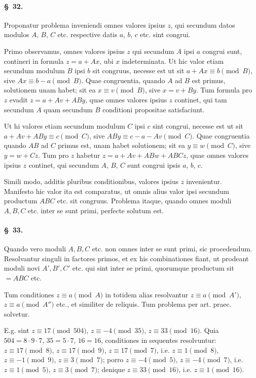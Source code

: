 \documentclass[12pt,a4paper]{article}
\theoremstyle{plain}
\theoremstyle{definition}
\theoremstyle{remark}
\newcommand{\art}[1]{\paragraph{\S\ #1.}}
\begin{document}
\art{32}
Proponatur problema inveniendi omnes valores ipsius $z$, qui secundum datos modulos $A$, $B$, $C$ etc. respective datis $a$, $b$, $c$ etc. sint congrui.

Primo observamus, omnes valores ipsius $z$ qui secundum $A$ ipsi $a$ congrui sunt, contineri in formula $z = a + Ax$, ubi $x$ indeterminata. Ut hic valor etiam secundum modulum $B$ ipsi $b$ sit congruus, necesse est ut sit $a + Ax \equiv b \pmod{B}$, sive $Ax \equiv b - a \pmod{B}$. Quae congruentia, quando $A$ ad $B$ est primus, solutionem unam habet; sit ea $x \equiv v \pmod{B}$, sive $x = v + By$. Tum formula pro $z$ evadit $z = a + Av + ABy$, quae omnes valores ipsius $z$ continet, qui tam secundum $A$ quam secundum $B$ conditioni propositae satisfaciunt.

Ut hi valores etiam secundum modulum $C$ ipsi $c$ sint congrui, necesse est ut sit $a + Av + ABy \equiv c \pmod{C}$, sive $ABy \equiv c - a - Av \pmod{C}$. Quae congruentia quando $AB$ ad $C$ primus est, unam habet solutionem; sit ea $y \equiv w \pmod{C}$, sive $y = w + Cz$. Tum pro $z$ habetur $z = a + Av + ABw + ABCz$, quae omnes valores ipsius $z$ continet, qui secundum $A$, $B$, $C$ sunt congrui ipsis $a$, $b$, $c$.

Simili modo, additis pluribus conditionibus, valores ipsius $z$ invenientur. Manifesto hic valor ita est comparatus, ut omnis alius valor ipsi secundum productum $ABC$ etc. sit congruus. Problema itaque, quando omnes moduli $A, B, C$ etc. inter se sunt primi, perfecte solutum est.

\art{33}
Quando vero moduli $A, B, C$ etc. non omnes inter se sunt primi, sic procedendum. Resolvantur singuli in factores primos, et ex his combinationes fiant, ut prodeant moduli novi $A', B', C'$ etc. qui sint inter se primi, quorumque productum sit $= ABC$ etc.

Tum conditiones $z \equiv a \pmod{A}$ in totidem alias resolvantur $z \equiv a \pmod{A'}$, $z \equiv a \pmod{A''}$ etc., et similiter de reliquis. Tum problema per art. praec. solvetur.

E.g. sint $z \equiv 17 \pmod{504}$, $z \equiv -4 \pmod{35}$, $z \equiv 33 \pmod{16}$. Quia $504 = 8 \cdot 9 \cdot 7$, $35 = 5 \cdot 7$, $16 = 16$, conditiones in sequentes resolvuntur: $z \equiv 17 \pmod{8}$, $z \equiv 17 \pmod{9}$, $z \equiv 17 \pmod{7}$, i.e. $z \equiv 1 \pmod{8}$, $z \equiv -1 \pmod{9}$, $z \equiv 3 \pmod{7}$; porro $z \equiv -4 \pmod{5}$, $z \equiv -4 \pmod{7}$, i.e. $z \equiv 1 \pmod{5}$, $z \equiv 3 \pmod{7}$; denique $z \equiv 33 \pmod{16}$, i.e. $z \equiv 1 \pmod{16}$.
\end{document}
